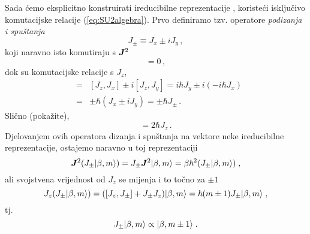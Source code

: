 Sada ćemo eksplicitno konstruirati ireducibilne reprezentacije , koristeći
isključivo komutacijske relacije (\ref{eq:SU2algebra}).
Prvo definiramo tzv. operatore \emph{podizanja i spuštanja}
\begin{equation}
    J_{\pm} \equiv J_x \pm i J_y \,, 
\end{equation}
koji naravno isto komutiraju s $\jsq$
\begin{equation}
    [\jsq, J_\pm] =0 \,,
\end{equation}
dok su komutacijske relacije s $J_z$, 
\begin{eqnarray*}
 [J_z, J_\pm]& = & [J_z, J_x] \pm i [J_z, J_y] = i\hbar J_y \pm i (-i\hbar J_x)
 \\ & = & \pm \hbar (J_x \pm i J_y) = \pm \hbar J_\pm \,.
\end{eqnarray*}
Slično (pokažite),
\begin{displaymath}
 [J_+, J_-] = 2 \hbar J_z \,.
\end{displaymath}
Djelovanjem ovih operatora dizanja i spuštanja na vektore neke ireducibilne
reprezentacije, ostajemo naravno u toj reprezentaciji
\begin{displaymath}
   \jsq(J_{\pm}\ket{\beta, m})=J_{\pm}\jsq\ket{\beta, m}=\beta\hbar^2
    (J_{\pm}\ket{\beta, m}) \;,
\end{displaymath}
ali svojstvena vrijednost od $J_z$ se mijenja i to točno za $\pm 1$
\begin{equation}
J_z(J_{\pm}| \beta, m \rangle)=([J_z,J_{\pm}]+J_{\pm}J_z)| \beta, m \rangle=
\hbar(m\pm 1)J_{\pm}| \beta, m \rangle \;,
\label{jzjpm}
\end{equation}
tj.
\begin{equation}
    J_{\pm}| \beta, m \rangle\propto | \beta, m\pm 1 \rangle \;.
    \label{eq:jpmpropto}
\end{equation}


